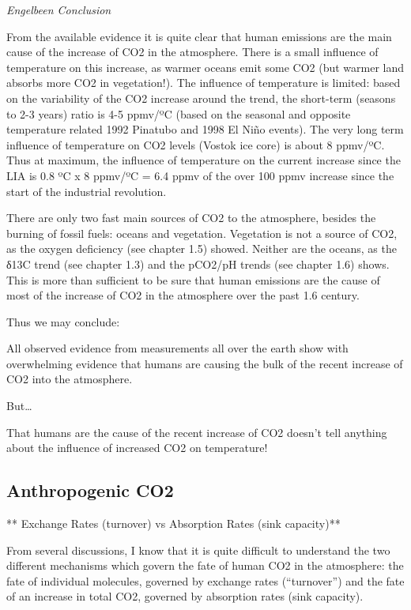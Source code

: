 \documentclass[
]{book}
\begin{document}
\emph{Engelbeen Conclusion}

From the available evidence it is quite clear that human emissions are the main cause of the increase of CO2 in the atmosphere. There is a small influence of temperature on this increase, as warmer oceans emit some CO2 (but warmer land absorbs more CO2 in vegetation!). The influence of temperature is limited: based on the variability of the CO2 increase around the trend, the short-term (seasons to 2-3 years) ratio is 4-5 ppmv/ºC (based on the seasonal and opposite temperature related 1992 Pinatubo and 1998 El Niño events). The very long term influence of temperature on CO2 levels (Vostok ice core) is about 8 ppmv/ºC. Thus at maximum, the influence of temperature on the current increase since the LIA is 0.8 ºC x 8 ppmv/ºC = 6.4 ppmv of the over 100 ppmv increase since the start of the industrial revolution.

There are only two fast main sources of CO2 to the atmosphere, besides the burning of fossil fuels: oceans and vegetation. Vegetation is not a source of CO2, as the oxygen deficiency (see chapter 1.5) showed. Neither are the oceans, as the δ13C trend (see chapter 1.3) and the pCO2/pH trends (see chapter 1.6) shows. This is more than sufficient to be sure that human emissions are the cause of most of the increase of CO2 in the atmosphere over the past 1.6 century.

Thus we may conclude:

All observed evidence from measurements all over the earth show with overwhelming evidence that humans are causing the bulk of the recent increase of CO2 into the atmosphere.

But\ldots{}

That humans are the cause of the recent increase of CO2 doesn't tell anything about the influence of increased CO2 on temperature!

\hypertarget{anthropogenic-co2}{%
\subsection{Anthropogenic CO2}\label{anthropogenic-co2}}

** Exchange Rates (turnover) vs Absorption Rates (sink capacity)**

From several discussions, I know that it is quite difficult to understand the two different mechanisms which govern the fate of human CO2 in the atmosphere: the fate of individual molecules, governed by exchange rates (``turnover'') and the fate of an increase in total CO2, governed by absorption rates (sink capacity).
\end{document}
